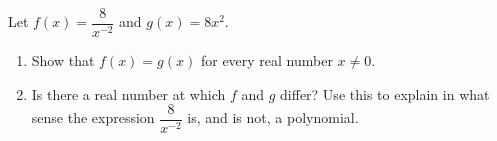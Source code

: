 Let $f(x)=\dfrac{8}{x^{-2}}$ and $g(x)=8x^2$.
\begin{enumerate}
\item[(a)] Show that $f(x)=g(x)$ for every real number $x\ne0$.
\item[(b)] Is there a real number at which $f$ and $g$ differ? Use this to explain in what sense the expression $\dfrac{8}{x^{-2}}$ is, and is not, a polynomial.
\end{enumerate}

